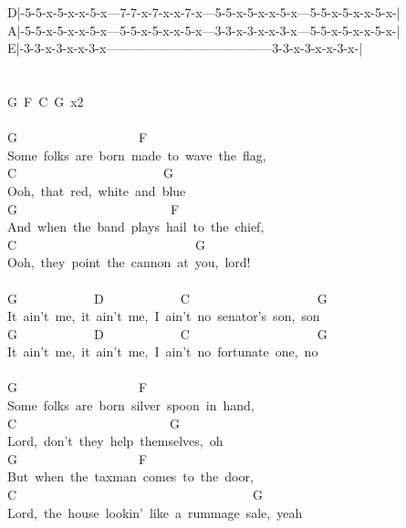 {D|-5-5-x-5-x-x-5-x---7-7-x-7-x-x-7-x---5-5-x-5-x-x-5-x---5-5-x-5-x-x-5-x-|\\
A|-5-5-x-5-x-x-5-x---5-5-x-5-x-x-5-x---3-3-x-3-x-x-3-x---5-5-x-5-x-x-5-x-|\\
E|-3-3-x-3-x-x-3-x---------------------------------------3-3-x-3-x-x-3-x-|\\
\\
\\
G\ F\ C\ G\ x2\\
\\
G\ \ \ \ \ \ \ \ \ \ \ \ \ \ \ \ \ \ \ F\ \ \ \ \ \\
Some\ folks\ are\ born\ made\ to\ wave\ the\ flag,\\
C\ \ \ \ \ \ \ \ \ \ \ \ \ \ \ \ \ \ \ \ \ \ \ G\\
Ooh,\ that\ red,\ white\ and\ blue\\
G\ \ \ \ \ \ \ \ \ \ \ \ \ \ \ \ \ \ \ \ \ \ \ \ F\\
And\ when\ the\ band\ plays\ \;hail\ to\ the\ chief\;,\\
C\ \ \ \ \ \ \ \ \ \ \ \ \ \ \ \ \ \ \ \ \ \ \ \ \ \ \ \ G\ \ \ \ \ \\
Ooh,\ they\ point\ the\ cannon\ at\ you,\ lord!\\
\\
G\ \ \ \ \ \ \ \ \ \ \ \ D\ \ \ \ \ \ \ \ \ \ \ \ C\ \ \ \ \ \ \ \ \ \ \ \ \ \ \ \ \ \ \ \ G\ \ \ \ \\
It\ ain't\ me,\ it\ ain't\ me,\ I\ ain't\ no\ senator's\ son,\ son\\
G\ \ \ \ \ \ \ \ \ \ \ \ D\ \ \ \ \ \ \ \ \ \ \ \ C\ \ \ \ \ \ \ \ \ \ \ \ \ \ \ \ \ \ \ \ G\ \ \\
It\ ain't\ me,\ it\ ain't\ me,\ I\ ain't\ no\ fortunate\ one,\ no\\
\\
G\ \ \ \ \ \ \ \ \ \ \ \ \ \ \ \ \ \ \ F\ \ \ \ \ \\
Some\ folks\ are\ born\ silver\ spoon\ in\ hand,\\
C\ \ \ \ \ \ \ \ \ \ \ \ \ \ \ \ \ \ \ \ \ \ \ \ G\\
Lord,\ don't\ they\ help\ themselves,\ oh\\
G\ \ \ \ \ \ \ \ \ \ \ \ \ \ \ \ \ \ \ F\\
But\ when\ the\ taxman\ comes\ to\ the\ door,\\
C\ \ \ \ \ \ \ \ \ \ \ \ \ \ \ \ \ \ \ \ \ \ \ \ \ \ \ \ \ \ \ \ \ \ \ \ \ G\\
Lord,\ the\ house\ lookin'\ like\ a\ rummage\ sale,\ yeah\\
}
